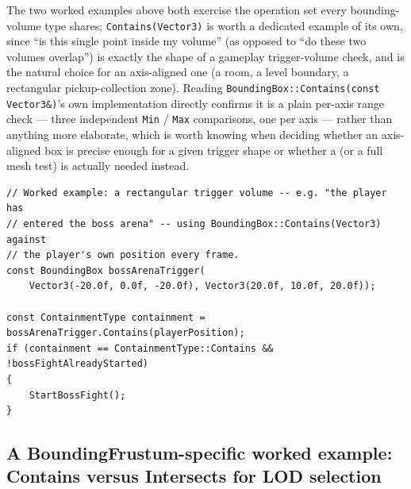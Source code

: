 The two worked examples above both exercise the operation set every bounding-volume type
shares; \texttt{Contains(Vector3)} is worth a dedicated example of its own, since ``is this
single point inside my volume'' (as opposed to ``do these two volumes overlap'') is exactly
the shape of a gameplay trigger-volume check, and  is the natural choice
for an axis-aligned one (a room, a level boundary, a rectangular pickup-collection zone).
Reading \texttt{BoundingBox::Contains(const Vector3\&)}'s own implementation directly confirms
it is a plain per-axis range check --- three independent \texttt{Min} / \texttt{Max}
comparisons, one per axis --- rather than anything more elaborate, which is worth knowing when
deciding whether an axis-aligned box is precise enough for a given trigger shape or whether a
 (or a full mesh test) is actually needed instead.

\begin{lstlisting}
// Worked example: a rectangular trigger volume -- e.g. "the player has
// entered the boss arena" -- using BoundingBox::Contains(Vector3) against
// the player's own position every frame.
const BoundingBox bossArenaTrigger(
    Vector3(-20.0f, 0.0f, -20.0f), Vector3(20.0f, 10.0f, 20.0f));

const ContainmentType containment = bossArenaTrigger.Contains(playerPosition);
if (containment == ContainmentType::Contains && !bossFightAlreadyStarted)
{
    StartBossFight();
}
\end{lstlisting}

\subsection{A BoundingFrustum-specific worked example: Contains versus Intersects for LOD selection}

